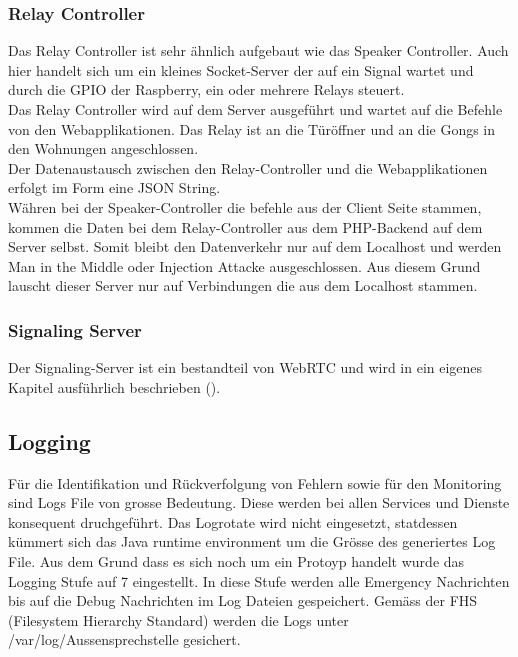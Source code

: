 \subsubsection{Relay Controller}
Das Relay Controller ist sehr ähnlich aufgebaut wie das Speaker Controller. Auch hier handelt sich um ein kleines Socket-Server der auf ein Signal wartet und durch die GPIO der Raspberry, ein oder mehrere Relays steuert.
\\
Das Relay Controller wird auf dem Server ausgeführt und wartet auf die Befehle von den Webapplikationen. Das Relay ist an die Türöffner und an die Gongs in den Wohnungen angeschlossen.
\\
Der Datenaustausch zwischen den Relay-Controller und die Webapplikationen erfolgt im Form eine JSON String.
\\
Währen bei der Speaker-Controller die befehle aus der Client Seite stammen, kommen die Daten bei dem Relay-Controller aus dem PHP-Backend auf dem Server selbst. Somit bleibt den Datenverkehr nur auf dem Localhost und werden Man in the Middle oder Injection Attacke ausgeschlossen. Aus diesem Grund lauscht dieser Server nur auf Verbindungen die aus dem Localhost stammen.

\subsubsection{Signaling Server}
Der Signaling-Server ist ein bestandteil von WebRTC und wird in ein eigenes Kapitel ausführlich beschrieben ().

\subsection{Logging}
\label{kap:logs}
Für die Identifikation und Rückverfolgung von Fehlern sowie für den Monitoring sind Logs File von grosse Bedeutung. Diese werden bei allen Services und Dienste konsequent druchgeführt. Das Logrotate wird nicht eingesetzt, statdessen kümmert sich das Java runtime environment um die Grösse des generiertes Log File. Aus dem Grund dass es sich noch um ein Protoyp handelt wurde das Logging Stufe auf 7 eingestellt. In diese Stufe werden alle Emergency Nachrichten bis auf die Debug Nachrichten im Log Dateien gespeichert.
Gemäss der FHS (Filesystem Hierarchy Standard) werden die Logs unter /var/log/Aussensprechstelle gesichert. 

